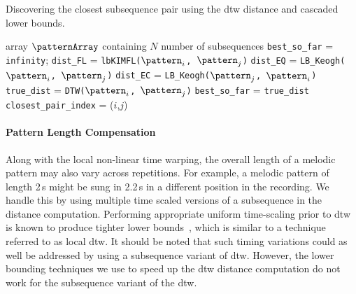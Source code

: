 \renewcommand{\algorithmiccomment}[1]{\bgroup\hfill\tiny//~#1\egroup}
\begin{algorithm}
\caption{Discovering the closest subsequence pair using the \gls{dtw} distance and cascaded lower bounds.}
\label{alg:algorithmdiscovery}
	\begin{algorithmic} 
	
	 array $\patternArray$ containing $N$ number of subsequences
	\State \texttt{best\_so\_far} = \texttt{infinity};
			\State  \texttt{dist\_FL} = \texttt{\acrshort{lbKIMFL}($\pattern_i$, $\pattern_j$)}			
				\State  \texttt{dist\_EQ} = \texttt{LB\_Keogh($\pattern_i$, $\pattern_j$)}				
					\State  \texttt{dist\_EC} = \texttt{LB\_Keogh($\pattern_j$, $\pattern_i$)}					
						\State  \texttt{true\_dist} = \texttt{DTW($\pattern_i$, $\pattern_j$)}						
							\State \texttt{best\_so\_far} = \texttt{true\_dist}
							\State \texttt{closest\_pair\_index} = ($i$,$j$)							
						\EndIf
					\EndIf
				\EndIf
			\EndIf
		\EndFor
	\EndFor
	
	\end{algorithmic}
\end{algorithm}
				

\paragraph{Pattern Length Compensation}
\label{PatternLengthCompensation}

Along with the local non-linear time warping, the overall length of a melodic pattern may also vary across repetitions. For example, a melodic pattern of length 2\,s might be sung in 2.2\,s in a different position in the recording. We handle this by using multiple time scaled versions of a subsequence in the distance computation. 
Performing appropriate uniform time-scaling prior to \gls{dtw} is known to produce tighter lower bounds~\citep{Zhu2003}, which is similar to a technique referred to as local \gls{dtw}. It should be noted that such timing variations could as well be addressed by using a subsequence variant of \gls{dtw}. However, the lower bounding techniques we use to speed up the \gls{dtw} distance computation do not work for the subsequence variant of the \gls{dtw}. 

